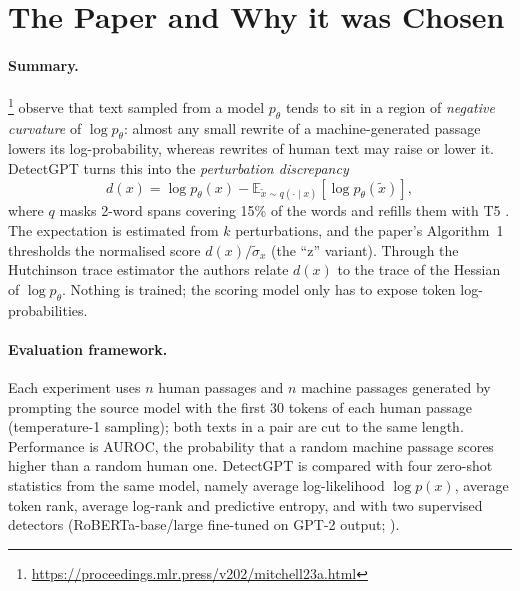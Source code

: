 \documentclass[11pt]{article}
\begin{document}
\section{The Paper and Why it was Chosen}
\label{sec:paper}
\paragraph{Summary.} \citet{mitchell2023detectgpt}\footnote{\url{https://proceedings.mlr.press/v202/mitchell23a.html}} observe that text sampled from a model $p_\theta$ tends to sit in a region of \emph{negative curvature} of $\log p_\theta$: almost any small rewrite of a machine-generated passage lowers its log-probability, whereas rewrites of human text may raise or lower it. DetectGPT turns this into the \emph{perturbation discrepancy}
\begin{equation}
d(x) = \log p_\theta(x) - \mathbb{E}_{\tilde{x}\sim q(\cdot\mid x)}\left[\log p_\theta(\tilde{x})\right],
\end{equation}
where $q$ masks 2-word spans covering 15\% of the words and refills them with T5 \citep{raffel2020t5}. The expectation is estimated from $k$ perturbations, and the paper's Algorithm~1 thresholds the normalised score $d(x)/\tilde\sigma_x$ (the ``z'' variant). Through the Hutchinson trace estimator \citep{hutchinson1989stochastic} the authors relate $d(x)$ to the trace of the Hessian of $\log p_\theta$. Nothing is trained; the scoring model only has to expose token log-probabilities.

\paragraph{Evaluation framework.} Each experiment uses $n$ human passages and $n$ machine passages generated by prompting the source model with the first 30 tokens of each human passage (temperature-1 sampling); both texts in a pair are cut to the same length. Performance is AUROC, the probability that a random machine passage scores higher than a random human one. DetectGPT is compared with four zero-shot statistics from the same model, namely average log-likelihood $\log p(x)$, average token rank, average log-rank \citep{gehrmann2019gltr} and predictive entropy, and with two supervised detectors (RoBERTa-base/large fine-tuned on GPT-2 output; \citealp{solaiman2019release}).
\end{document}
